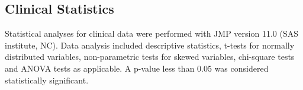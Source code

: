 \subsection{Clinical Statistics}

Statistical analyses for clinical data were performed with JMP version 11.0 
(SAS institute, NC).  Data analysis included descriptive statistics, t-tests 
for normally distributed variables, non-parametric tests for skewed variables, 
chi-square tests and ANOVA tests as applicable. A p-value less than 0.05 was 
considered statistically significant.
